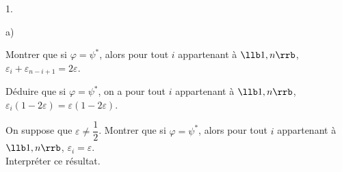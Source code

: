 \begin{noliste}{1.}
\begin{noliste}{a)}
  \item Montrer que si $\varphi= \psi^*$, alors pour tout $i$ 
  appartenant à $\llb 1,n \rrb$, $\varepsilon_i+ \varepsilon_{n-i+1}=2 
  \varepsilon$. 
  
  

  
  \item Déduire que si $\varphi= \psi^*$, on a pour tout $i$ 
  appartenant à $\llb 1,n \rrb$, $\varepsilon_i(1-2\varepsilon)= 
  \varepsilon(1-2\varepsilon)$.
  
  
  
  

  
  \item On suppose que $\varepsilon \neq \dfrac{1}{2}$.  Montrer que si 
  $\varphi= \psi^*$, alors pour tout $i$ appartenant à $\llb 1,n \rrb$, 
  $\varepsilon_i=\varepsilon$. \\[.1cm]
  Interpréter ce résultat.
  
  

 \end{noliste}
\end{noliste}






